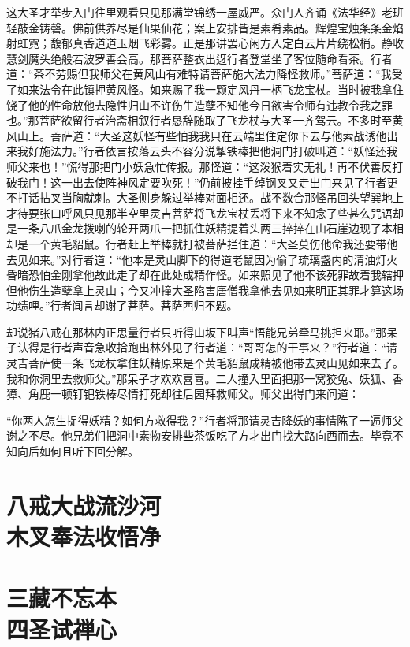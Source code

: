 \documentclass[12pt,UTF8]{ctexbook}
\begin{document}
{这大圣才举步入门往里观看只见那满堂锦绣一屋威严。众门人齐诵《法华经》老班轻敲金铸磬。佛前供养尽是仙果仙花；案上安排皆是素肴素品。辉煌宝烛条条金焰射虹霓；馥郁真香道道玉烟飞彩雾。正是那讲罢心闲方入定白云片片绕松梢。静收慧剑魔头绝般若波罗善会高。那菩萨整衣出迓行者登堂坐了客位随命看茶。行者道：“茶不劳赐但我师父在黄风山有难特请菩萨施大法力降怪救师。”菩萨道：“我受了如来法令在此镇押黄风怪。如来赐了我一颗定风丹一柄飞龙宝杖。当时被我拿住饶了他的性命放他去隐性归山不许伤生造孽不知他今日欲害令师有违教令我之罪也。”那菩萨欲留行者治斋相叙行者恳辞随取了飞龙杖与大圣一齐驾云。不多时至黄风山上。菩萨道：“大圣这妖怪有些怕我我只在云端里住定你下去与他索战诱他出来我好施法力。”行者依言按落云头不容分说掣铁棒把他洞门打破叫道：“妖怪还我师父来也！”慌得那把门小妖急忙传报。那怪道：“这泼猴着实无礼！再不伏善反打破我门！这一出去使阵神风定要吹死！”仍前披挂手绰钢叉又走出门来见了行者更不打话拈叉当胸就刺。大圣侧身躲过举棒对面相还。战不数合那怪吊回头望巽地上才待要张口呼风只见那半空里灵吉菩萨将飞龙宝杖丢将下来不知念了些甚么咒语却是一条八爪金龙拨喇的轮开两爪一把抓住妖精提着头两三捽捽在山石崖边现了本相却是一个黄毛貂鼠。行者赶上举棒就打被菩萨拦住道：“大圣莫伤他命我还要带他去见如来。”对行者道：“他本是灵山脚下的得道老鼠因为偷了琉璃盏内的清油灯火昏暗恐怕金刚拿他故此走了却在此处成精作怪。如来照见了他不该死罪故着我辖押但他伤生造孽拿上灵山；今又冲撞大圣陷害唐僧我拿他去见如来明正其罪才算这场功绩哩。”行者闻言却谢了菩萨。菩萨西归不题。

却说猪八戒在那林内正思量行者只听得山坂下叫声“悟能兄弟牵马挑担来耶。”那呆子认得是行者声音急收拾跑出林外见了行者道：“哥哥怎的干事来？”行者道：“请灵吉菩萨使一条飞龙杖拿住妖精原来是个黄毛貂鼠成精被他带去灵山见如来去了。我和你洞里去救师父。”那呆子才欢欢喜喜。二人撞入里面把那一窝狡兔、妖狐、香獐、角鹿一顿钉钯铁棒尽情打死却往后园拜救师父。师父出得门来问道：

“你两人怎生捉得妖精？如何方救得我？”行者将那请灵吉降妖的事情陈了一遍师父谢之不尽。他兄弟们把洞中素物安排些茶饭吃了方才出门找大路向西而去。毕竟不知向后如何且听下回分解。

\chapter[八戒大战流沙河\ 木叉奉法收悟净]{八戒大战流沙河\\木叉奉法收悟净}
\chapter[三藏不忘本\ 四圣试禅心]{三藏不忘本\\四圣试禅心}

}
\end{document}
